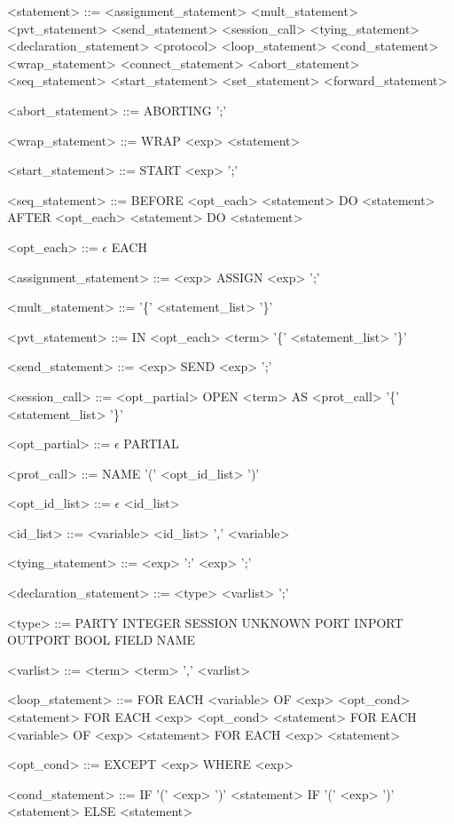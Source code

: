 \begin{grammar}
<statement> ::= <assignment\_statement> \alt <mult\_statement> \alt <pvt\_statement> \alt <send\_statement> \alt <session\_call> \alt <tying\_statement> \alt <declaration\_statement> \alt <protocol> \alt <loop\_statement> \alt <cond\_statement> \alt <wrap\_statement> \alt <connect\_statement> \alt <abort\_statement> \alt <seq\_statement> \alt <start\_statement> \alt <set\_statement> \alt <forward\_statement>

<abort\_statement> ::= ABORTING ';'

<wrap\_statement> ::= WRAP <exp> <statement>

<start\_statement> ::= START <exp> ';'

<seq\_statement> ::= BEFORE <opt\_each> <statement> DO <statement> \alt AFTER <opt\_each> <statement> DO <statement>

<opt\_each> ::= $\epsilon$ \alt EACH

<assignment\_statement> ::= <exp> ASSIGN <exp> ';'

<mult\_statement> ::= '\{' <statement\_list> '\}'

<pvt\_statement> ::= IN <opt\_each> <term> '\{' <statement\_list> '\}'

<send\_statement> ::= <exp> SEND <exp> ';'

<session\_call> ::= <opt\_partial> OPEN <term> AS <prot\_call> '\{' <statement\_list> '\}'

<opt\_partial> ::= $\epsilon$ \alt PARTIAL

<prot\_call> ::= NAME '(' <opt\_id\_list> ')'

<opt\_id\_list> ::= $\epsilon$ \alt <id\_list>

<id\_list> ::= <variable> \alt <id\_list> ',' <variable>

<tying\_statement> ::= <exp> ':' <exp> ';'

<declaration\_statement> ::= <type> <varlist> ';'

<type> ::= PARTY \alt INTEGER \alt SESSION \alt UNKNOWN \alt PORT \alt INPORT \alt OUTPORT \alt BOOL \alt FIELD \alt NAME

<varlist> ::= <term> \alt <term> ',' <varlist>

<loop\_statement> ::= FOR EACH <variable> OF <exp> <opt\_cond> <statement> \alt FOR EACH <exp> <opt\_cond> <statement> \alt FOR EACH <variable> OF <exp> <statement> \alt FOR EACH <exp> <statement>

<opt\_cond> ::= EXCEPT <exp> \alt WHERE <exp>

<cond\_statement> ::= IF '(' <exp> ')' <statement> \alt IF '(' <exp> ')' <statement> ELSE <statement>


\end{grammar}
